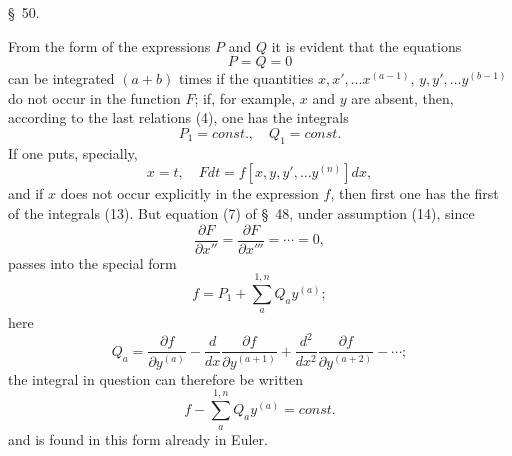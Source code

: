 \documentclass[11pt,a4paper,leqno]{article}
\begin{document}
\begin{center}
{\large \S~50.}
\end{center}

From the form of the expressions $P$ and $Q$ it is evident that the equations
\[
P=Q=0
\]
can be integrated $(a+b)$ times if the quantities $x,x',\ldots x^{(a-1)}$, $y,y',\ldots y^{(b-1)}$ do not occur in the function $F$; if, for example, $x$ and $y$ are absent, then, according to the last relations (4), one has the integrals
\begin{equation}\tag{13}
P_1=const.,\quad Q_1=const.
\end{equation}
If one puts, specially,
\begin{equation}\tag{14}
x=t,\quad Fdt=f[x,y,y',\ldots y^{(n)}]dx,
\end{equation}
and if $x$ does not occur explicitly in the expression $f$, then first one has the first of the integrals (13). But equation (7) of \S~48, under assumption (14), since
\[
\frac{\partial F}{\partial x''}=\frac{\partial F}{\partial x'''}=\cdots=0,
\]
passes into the special form
\[
f=P_1+\sum_a^{1,n}Q_ay^{(a)};
\]
here
\[
Q_a=\frac{\partial f}{\partial y^{(a)}}-\frac{d}{dx}\frac{\partial f}{\partial y^{(a+1)}}+\frac{d^2}{dx^2}\frac{\partial f}{\partial y^{(a+2)}}-\cdots;
\]
the integral in question can therefore be written
\begin{equation}\tag{15}
f-\sum_a^{1,n}Q_ay^{(a)}=const.
\end{equation}
and is found in this form already in Euler.
\end{document}
